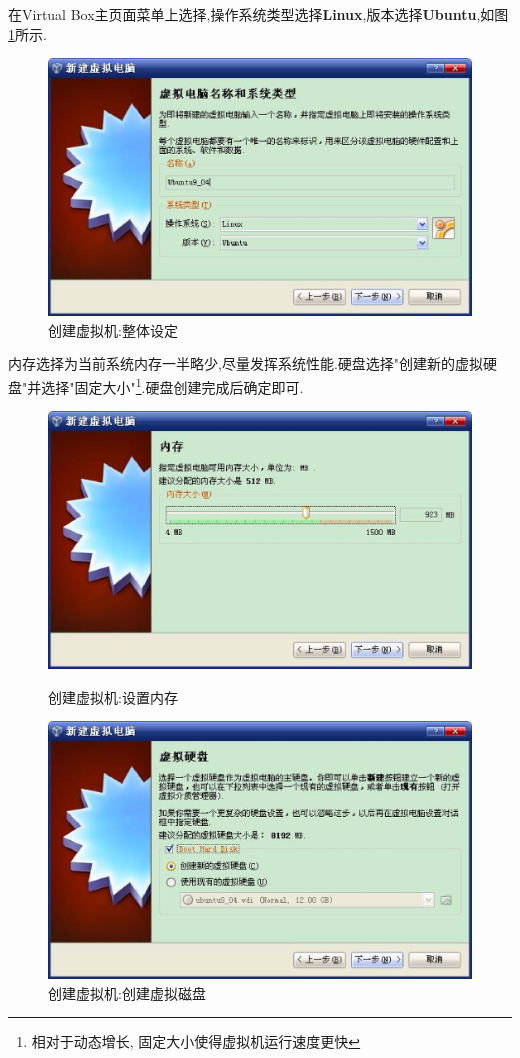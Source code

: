 \documentclass[12pt,a4paper]{article}
\begin{document}
在Virtual Box主页面菜单上选择,操作系统类型选择\textbf{Linux},版本选择\textbf{Ubuntu},如图\ref{f_create_vb1}所示.
\begin{figure}[!bthp]
\centering\includegraphics[width=1\textwidth]{pic/f_create_vb1.eps}
\caption{创建虚拟机:整体设定\label{f_create_vb1}}
\end{figure}
内存选择为当前系统内存一半略少,尽量发挥系统性能.硬盘选择"创建新的虚拟硬盘"并选择"固定大小"\footnote{相对于动态增长,
固定大小使得虚拟机运行速度更快}.硬盘创建完成后确定即可.
\begin{figure}[!bthp]
\includegraphics[width=1\textwidth]{pic/f_create_vb_mem.eps}
\caption{创建虚拟机:设置内存}
\includegraphics[width=1\textwidth]{pic/f_create_vb_hdisk.eps}
\caption{创建虚拟机:创建虚拟磁盘}
\end{figure}
\end{document}
